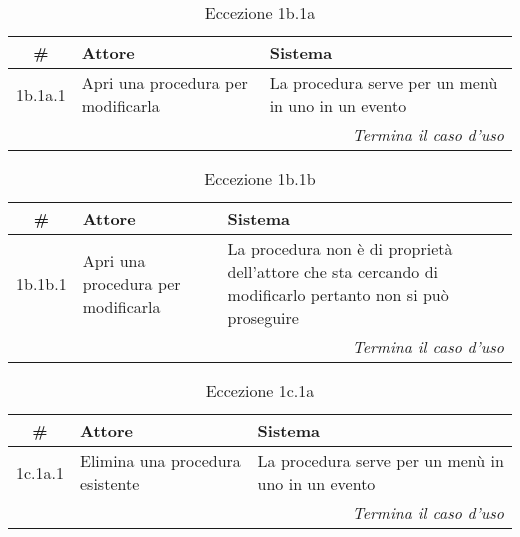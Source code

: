 \begin{table}[H]\centering\color{red}\caption*{Eccezione 1b.1a}
      \small
      \begin{tabular}{|c|p{7cm}|p{5.8cm}|}
            \hline\bfseries \# & \bfseries Attore                   & \bfseries Sistema                                  \\\hline
            1b.1a.1            & Apri una procedura per modificarla & La procedura serve per un menù in uno in un evento \\\hline
            \multicolumn{3}{|r|}{\textit{Termina il caso d'uso}}                                                         \\\hline
      \end{tabular}
\end{table}

\begin{table}[H]\centering\color{red}\caption*{Eccezione 1b.1b}
      \small
      \begin{tabular}{|c|p{7cm}|p{5.8cm}|}
            \hline\bfseries \# & \bfseries Attore                   & \bfseries Sistema                                                                                          \\\hline
            1b.1b.1            & Apri una procedura per modificarla & La procedura non è di proprietà dell’attore che sta cercando di modificarlo pertanto non si può proseguire \\\hline
            \multicolumn{3}{|r|}{\textit{Termina il caso d'uso}}                                                                                                                 \\\hline
      \end{tabular}
\end{table}

\begin{table}[H]\centering\color{red}\caption*{Eccezione 1c.1a}
      \small
      \begin{tabular}{|c|p{7cm}|p{5.8cm}|}
            \hline\bfseries \# & \bfseries Attore                & \bfseries Sistema                                  \\\hline
            1c.1a.1            & Elimina una procedura esistente & La procedura serve per un menù in uno in un evento \\\hline
            \multicolumn{3}{|r|}{\textit{Termina il caso d'uso}}                                                      \\\hline
      \end{tabular}
\end{table}

